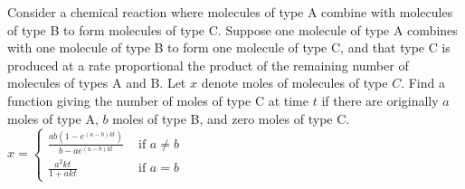 {
Consider a chemical reaction where molecules of type A combine with molecules of type B to form molecules of type C.  Suppose one molecule of type A combines with one molecule of type B to form one molecule of type C, and that type C is produced at a rate proportional the product of the remaining number of molecules of types A and B.  Let $x$ denote moles of molecules of type $C$.  Find a function giving the number of moles of type C at time $t$ if there are originally $a$ moles of type A, $b$ moles of type B, and zero moles of type C.
}
{
$ x =
\begin{cases}
	\displaystyle\frac{ab(1 - e^{(a-b)kt})}{b-ae^{(a-b)kt}} & \text{ if } a \neq b\\
	\displaystyle \frac{a^2kt}{1+akt} & \text{ if } a = b
\end{cases}$
}
